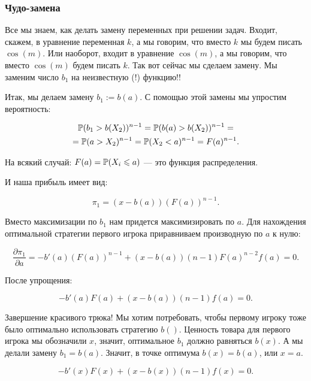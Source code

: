 \begin{enumerate}
\subsubsection*{Чудо-замена}

Все мы знаем, как делать замену переменных при решении задач. Входит, скажем, в уравнение переменная $ k $, а мы говорим, что вместо $k$ мы будем писать $ \cos(m) $. Или наоборот, входит в уравнение $ \cos(m) $, а мы говорим, что вместо $ \cos(m) $ будем писать $k$. Так вот сейчас мы сделаем замену. Мы заменим число $ b_{1} $ на неизвестную (!) функцию!!

Итак, мы делаем замену $ b_{1}:=b(a) $. С помощью этой замены мы упростим вероятность:

\begin{multline}
\P(b_{1}>b(X_{2}))^{n-1}=\P(b(a)>b(X_{2}))^{n-1}=\\
=\P(a>X_{2})^{n-1}=\P(X_{2}<a)^{n-1}=F(a)^{n-1}.
\end{multline}

На всякий случай: $ F(a)=\P(X_{i}\leq a) $ — это функция распределения.

И наша прибыль имеет вид:

\begin{equation}
\pi_{1}=(x-b(a))(F(a))^{n-1}.
\end{equation}


Вместо максимизации по $ b_{1} $ нам придется максимизировать по $ a $. Для нахождения оптимальной стратегии первого игрока приравниваем производную по $ a $ к нулю:

\begin{equation}
\frac{\partial \pi_{1}}{\partial a}=-b'(a)(F(a))^{n-1}+(x-b(a))(n-1)F(a)^{n-2}f(a)=0.
\end{equation}


После упрощения:

\begin{equation}
-b'(a)F(a)+(x-b(a))(n-1)f(a)=0.
\end{equation}


Завершение красивого трюка! Мы хотим потребовать, чтобы первому игроку тоже было оптимально использовать стратегию $ b() $. Ценность товара для первого игрока мы обозначили $ x $, значит, оптимальное $ b_{1} $ должно равняться $ b(x) $. А мы делали замену $ b_{1}=b(a) $. Значит, в точке оптимума $ b(x)=b(a) $, или $ x=a $.

\begin{equation}
\label{first_price_final_diffeq}
-b'(x)F(x)+(x-b(x))(n-1)f(x)=0.
\end{equation}



\end{enumerate}

